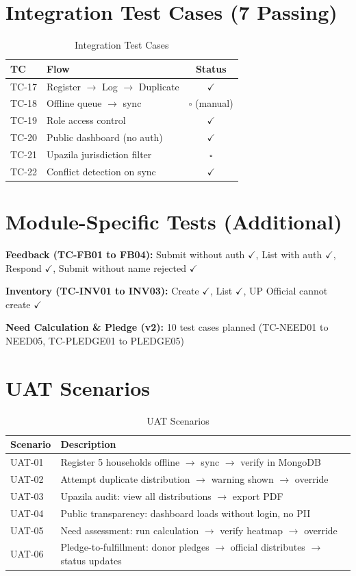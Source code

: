 \section{Integration Test Cases (7 Passing)}
\begin{table}[H]
\centering
\caption{Integration Test Cases}
\label{tab:integration-tests}
\begin{tabularx}{\textwidth}{@{}lXc@{}}
\toprule
TC & Flow & Status \\
\midrule
TC-17 & Register $\rightarrow$ Log $\rightarrow$ Duplicate & $\checkmark$ \\
TC-18 & Offline queue $\rightarrow$ sync & $\square$ (manual) \\
TC-19 & Role access control & $\checkmark$ \\
TC-20 & Public dashboard (no auth) & $\checkmark$ \\
TC-21 & Upazila jurisdiction filter & $\square$ \\
TC-22 & Conflict detection on sync & $\checkmark$ \\
\bottomrule
\end{tabularx}
\end{table}

\section{Module-Specific Tests (Additional)}
\textbf{Feedback (TC-FB01 to FB04):} Submit without auth $\checkmark$, List with auth $\checkmark$, Respond $\checkmark$, Submit without name rejected $\checkmark$

\textbf{Inventory (TC-INV01 to INV03):} Create $\checkmark$, List $\checkmark$, UP Official cannot create $\checkmark$

\textbf{Need Calculation \& Pledge (v2):} 10 test cases planned (TC-NEED01 to NEED05, TC-PLEDGE01 to PLEDGE05)

\section{UAT Scenarios}
\begin{table}[H]
\centering
\caption{UAT Scenarios}
\label{tab:uat}
\begin{tabularx}{\textwidth}{@{}lX@{}}
\toprule
Scenario & Description \\
\midrule
UAT-01 & Register 5 households offline $\rightarrow$ sync $\rightarrow$ verify in MongoDB \\
UAT-02 & Attempt duplicate distribution $\rightarrow$ warning shown $\rightarrow$ override \\
UAT-03 & Upazila audit: view all distributions $\rightarrow$ export PDF \\
UAT-04 & Public transparency: dashboard loads without login, no PII \\
UAT-05 & Need assessment: run calculation $\rightarrow$ verify heatmap $\rightarrow$ override \\
UAT-06 & Pledge-to-fulfillment: donor pledges $\rightarrow$ official distributes $\rightarrow$ status updates \\
\bottomrule
\end{tabularx}
\end{table}

